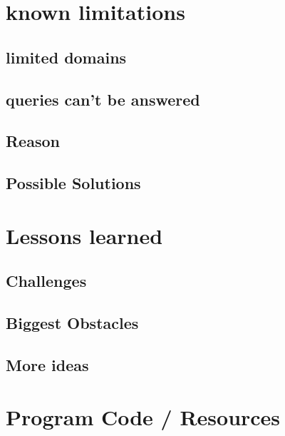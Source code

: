 \documentclass[11pt,titlepage,oneside,openany]{book}
\begin{document}
\chapter{known limitations}
\label{cha:limits}





\section{limited domains}
\label{sec:lidomain}



\section{queries can't be answered}
\label{sec:unquery}

\section{Reason}
\label{sec:reason}


\section{Possible Solutions}
\label{sec:solution}



\chapter{Lessons learned}
\label{cha:lessons}

\section{Challenges}
\label{sec:challenge}

\section{Biggest Obstacles}
\label{sec:obstacle}

\section{More ideas}
\label{sec:idea}





\appendix

\chapter{Program Code / Resources}
\label{cha:appendix-a}
\end{document}
